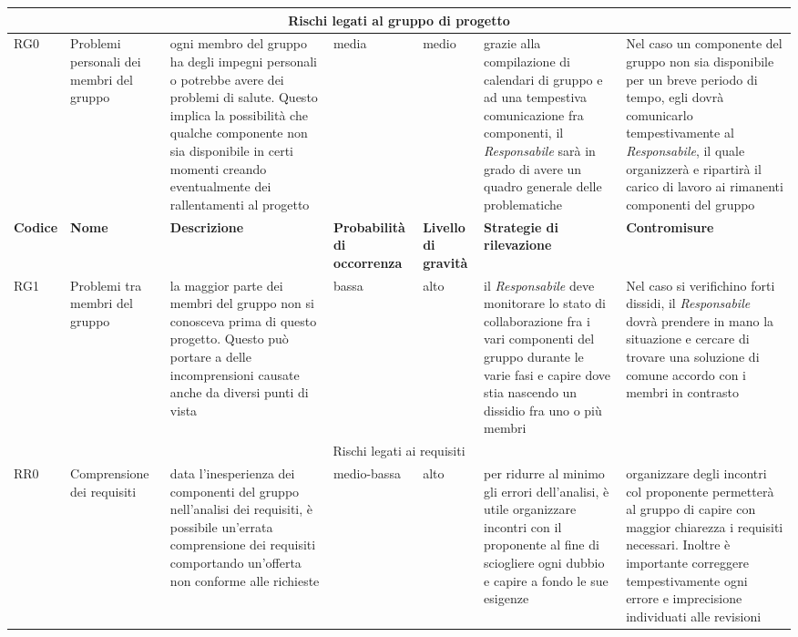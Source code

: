 \documentclass[../PianodiProgetto.tex]{subfiles}
\begin{document}
\begin{longtable}{|p{15mm}|p{23.5mm}|p{38mm}|p{22mm}|p{19mm}|p{30mm}|p{30mm}|}
		\hline\multicolumn{7}{|c|}{Rischi legati al gruppo di progetto} \\ 
		
		\hline RG0 & Problemi personali dei membri del gruppo & ogni membro del gruppo ha degli impegni personali o potrebbe avere dei problemi di salute. Questo implica la possibilità che qualche componente non sia disponibile in certi momenti creando eventualmente dei rallentamenti al progetto & media & medio & grazie alla compilazione di calendari di gruppo e ad una tempestiva comunicazione fra componenti, il \textit{Responsabile} sarà in grado di avere un quadro generale delle problematiche & Nel caso un componente del gruppo non sia disponibile per un breve periodo di tempo, egli dovrà comunicarlo tempestivamente al \textit{Responsabile}, il quale organizzerà e ripartirà il carico di lavoro ai rimanenti componenti del gruppo \\ \hline

	\newpage

		\hline \textbf{Codice} & \textbf{Nome} & \textbf{Descrizione} & \textbf{Probabilità di occorrenza} & \textbf{Livello di gravità} & \textbf{Strategie di rilevazione} & \textbf{Contromisure} \\

		\hline RG1 & Problemi tra membri del gruppo & la maggior parte dei membri del gruppo non si conosceva prima di questo progetto. Questo può portare a delle incomprensioni causate anche da diversi punti di vista & bassa & alto & il \textit{Responsabile} deve monitorare lo stato di collaborazione fra i vari componenti del gruppo durante le varie fasi e capire dove stia nascendo un dissidio fra uno o più membri & Nel caso si verifichino forti dissidi, il \textit{Responsabile} dovrà prendere in mano la situazione e cercare di trovare una soluzione di comune accordo con i membri in contrasto \\ 

		\hline \multicolumn{7}{|c|}{Rischi legati ai requisiti} \\ 

		\hline  RR0 & Comprensione dei requisiti & data l'inesperienza dei componenti del gruppo nell'analisi dei requisiti, è possibile un'errata comprensione dei requisiti comportando un'offerta non conforme alle richieste & medio-bassa & alto & per ridurre al minimo gli errori dell'analisi, è utile organizzare incontri con il proponente al fine di sciogliere ogni dubbio e capire a fondo le sue esigenze & organizzare degli incontri col proponente permetterà al gruppo di capire con maggior chiarezza i requisiti necessari. Inoltre è importante correggere tempestivamente ogni errore e imprecisione individuati alle revisioni \\ \hline


\end{longtable}
\end{document}
